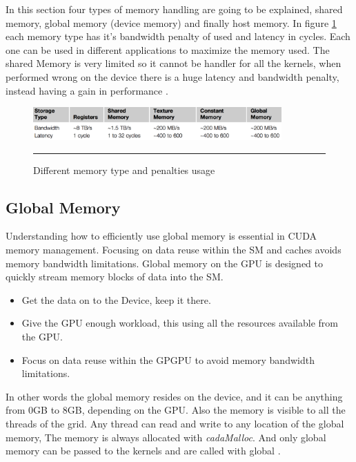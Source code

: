 In this section four types of memory handling are going to be explained, shared memory, global memory (device memory) and finally host memory. In figure \ref{fig:memory} each memory type has it's bandwidth penalty of used and latency in cycles. Each one can be used in different applications to maximize the memory used. The shared Memory is very limited so it cannot be handler for all the kernels, when performed wrong on the device there is a huge latency and bandwidth penalty, instead having a gain in performance \cite{cook}.

\begin{figure}[htbp]
	\centering
		\includegraphics[width=0.85\textwidth]{Figures/memory.png}
		\rule{35em}{0.5pt}
	\caption[Different memory types]{Different memory type and penalties usage}
	\label{fig:memory}
\end{figure}


\subsection{Global Memory}

Understanding how to efficiently use global memory is essential in CUDA memory management.
Focusing on data reuse within the SM and caches avoids memory bandwidth limitations. Global memory on the GPU is designed to quickly stream memory blocks of data into the SM.

\begin{itemize}
\item Get the data on to the Device, keep it there.
\item Give the GPU enough workload, this using all the resources available from the GPU.
\item Focus on data reuse within the GPGPU to avoid memory bandwidth limitations.
\end{itemize}

In other words the global memory resides on the device, and it can be anything from 0GB to 8GB, depending on the GPU. Also the memory is visible to all the threads of the grid. Any thread can read and write to any location of the global memory, The memory is always allocated with \textit{cadaMalloc}. And only global memory can be passed to the kernels and are called with \twoline global \twoline. \cite{design}


